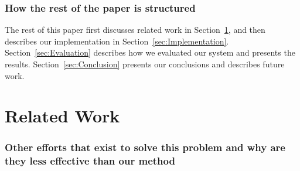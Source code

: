 \documentclass[11pt]{article}
\newcommand{\secref}[1]{Section~\ref{#1}}
\begin{document}
\subsubsection* {How the rest of the paper is structured}


The rest of this paper first discusses related work in
\secref{sec:RelatedWork}, and then describes our implementation in
\secref{sec:Implementation}. \secref{sec:Evaluation} describes how we evaluated
our system and presents the results. \secref{sec:Conclusion} presents our
conclusions and describes future work.


\section{Related Work}
\label{sec:RelatedWork}

\subsubsection*{Other efforts that exist to solve this problem and why are they
less effective than our method}
\end{document}
